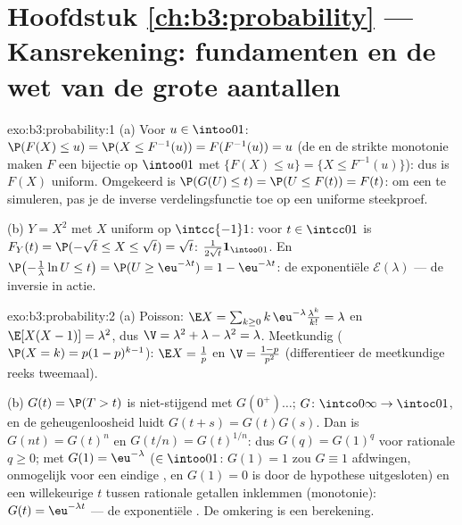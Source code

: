 \section*{Hoofdstuk \ref{ch:b3:probability} --- Kansrekening:
fundamenten en de wet van de grote aantallen}

\begin{solution}{exo:b3:probability:1}
(a) Voor $u \in \intoo01$: $\P(F(X) \leq u) = \P(X \leq
F^{-1}(u)) = F(F^{-1}(u)) = u$ (de  en de strikte
monotonie maken $F$ een bijectie op $\intoo01$ met $\{F(X) \leq
u\} = \{X \leq F^{-1}(u)\}$): dus is $F(X)$ uniform. Omgekeerd is
$\P(G(U) \leq t) = \P(U \leq F(t)) = F(t)$: om een  te
simuleren, pas je de inverse verdelingsfunctie toe op een
uniforme steekproef.

(b) $Y = X^2$ met $X$ uniform op $\intcc{-1}1$: voor $t \in
\intcc01$ is $F_Y(t) = \P(-\sqrt t \leq X \leq \sqrt t) = \sqrt
t$:  $\frac1{2\sqrt t}\mathbf 1_{\intoo01}$. En
$\P\bigl(-\frac1\lambda\ln U \leq t\bigr) = \P(U \geq
\eu^{-\lambda t}) = 1 - \eu^{-\lambda t}$: de exponentiële
 $\mathcal E(\lambda)$ --- de inversie in actie.
\end{solution}

\begin{solution}{exo:b3:probability:2}
(a) Poisson: $\E X = \sum_{k\geq0}k\,\eu^{-\lambda}
\frac{\lambda^k}{k!} = \lambda$ en $\E[X(X-1)] = \lambda^2$, dus
$\V = \lambda^2 + \lambda - \lambda^2 = \lambda$. Meetkundig
($\P(X = k) = p(1-p)^{k-1}$): $\E X = \frac1p$ en $\V =
\frac{1-p}{p^2}$ (differentieer de meetkundige reeks tweemaal).

(b) $G(t) = \P(T > t)$ is niet-stijgend met $G(0^+)\dots$; $G
\colon \intco0\infty \to \intoc01$, en de geheugenloosheid luidt
$G(t + s) = G(t)G(s)$. Dan is $G(n t) = G(t)^n$ en $G(t/n) =
G(t)^{1/n}$: dus $G(q) = G(1)^q$ voor rationale $q \geq 0$; met
$G(1) = \eu^{-\lambda}$ ($\in \intoo01$: $G(1) = 1$ zou $G \equiv
1$ afdwingen, onmogelijk voor een eindige ,
en $G(1) = 0$ is door de hypothese uitgesloten) en een
willekeurige $t$ tussen rationale getallen inklemmen (monotonie):
$G(t) = \eu^{-\lambda t}$ --- de exponentiële . De
omkering is een berekening.
\end{solution}

